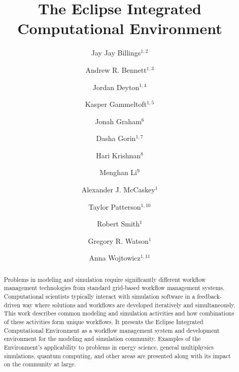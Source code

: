 \documentclass{elsart}
\begin{document}
\begin{frontmatter}

\title{The Eclipse Integrated Computational Environment}

\author{Jay Jay Billings$^{1,2}$}
\author{Andrew R. Bennett$^{1,3}$}
\author{Jordan Deyton$^{1,4}$}
\author{Kasper Gammeltoft$^{1,5}$}
\author{Jonah Graham$^{6}$}
\author{Dasha Gorin$^{1,7}$}
\author{Hari Krishnan$^{8}$}
\author{Menghan Li$^{9}$}
\author{Alexander J. McCaskey$^{1}$}
\author{Taylor Patterson$^{1,10}$}
\author{Robert Smith$^{1}$}
\author{Gregory R. Watson$^{1}$}
\author{Anna Wojtowicz$^{1,11}$}

\address{$^{1}$Computer Science and Mathematics Division, Oak Ridge National
Laboratory, Oak Ridge, TN 37830, USA}
\address{$^{2}$The Bredesen Center for Interdisciplinary Research and Graduate
Education, University of Tennessee, 444 Greve Hall, 821 Volunteer
  Blvd. Knoxville, TN 37996-3394}
\address{$^{3}$University of Washington, Seattle, WA 98105}
\address{$^{4}$General Electric Company, 3200 North Grandview Blvd Waukesha, WI
53188-1678}
\address{$^{5}$Georgia Institute of Technology North Avenue, Atlanta, GA 30332}
\address{$^{6}$Kichwa Coders Ltd., 1 Plomer Green Avenue Downley, High Wycombe
HP13 5LN United Kingdom}
\address{$^{7}$Northwestern University, 633 Clark Street Evanston, IL 60208}
\address{$^{8}$Lawrence Berkeley National Laboratory, 1 Cyclotron Rd, Berkeley,
CA 94720}
\address{$^{9}$Department of Computer Science and Department of Biological
Sciences, Purdue University, West Lafayette, IN 47906} 
\address{$^{10}$Acato Information Management, LLC, 114 Union Valley Rd., Oak Ridge,
TN 37830}
\address{$^{11}$Colorado State University, Fort Collins, CO 80523}

\begin{abstract}

Problems in modeling and simulation require significantly different
workflow management technologies from standard grid-based workflow
management systems. Computational scientists typically interact with
simulation software in a feedback-driven way where solutions and
workflows are developed iteratively and simultaneously. This work
describes common modeling and simulation activities and how combinations of these
activities form unique workflows. It presents the Eclipse Integrated
Computational Environment as a workflow management system and
development environment for the modeling and simulation community.
Examples of the Environment's applicability to problems in energy
science, general multiphysics simulations, quantum computing, and other
areas are presented along with its impact on the community at large.


\end{abstract}
\end{frontmatter}
\end{document}
